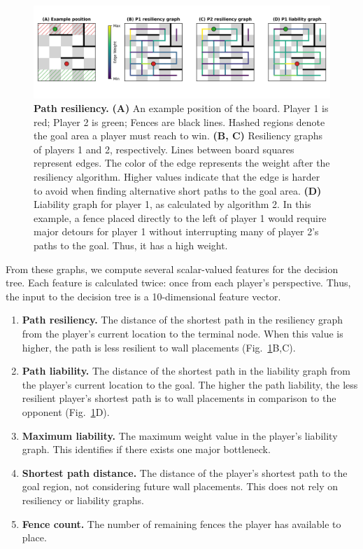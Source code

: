 \documentclass[10pt]{article}
\begin{document}
\begin{figure}[H]
    \centering
    \includegraphics[width=\linewidth]{path_figure.png}
    \caption{\textbf{Path resiliency.} \textbf{(A)} An example position of the board. Player 1 is red; Player 2 is green; Fences are black lines. Hashed regions denote the goal area a player must reach to win. \textbf{(B, C)} Resiliency graphs of players 1 and 2, respectively. Lines between board squares represent edges. The color of the edge represents the weight after the resiliency algorithm. Higher values indicate that the edge is harder to avoid when finding alternative short paths to the goal area. \textbf{(D)} Liability graph for player 1, as calculated by algorithm 2. In this example, a fence placed directly to the left of player 1 would require major detours for player 1 without interrupting many of player 2's paths to the goal. Thus, it has a high weight.}
    \label{fig:resiliency}
\end{figure}


From these graphs, we compute several scalar-valued features for the decision tree. Each feature is calculated twice: once from each player's perspective. Thus, the input to the decision tree is a 10-dimensional feature vector. 

\begin{enumerate}
    \item \textbf{Path resiliency.} The distance of the shortest path in the resiliency graph from the player's current location to the terminal node. When this value is higher, the path is less resilient to wall placements (Fig.~\ref{fig:resiliency}B,C).
    \item \textbf{Path liability.} The distance of the shortest path in the liability graph from the player's current location to the goal. The higher the path liability, the less resilient player's shortest path is to wall placements in comparison to the opponent (Fig.~\ref{fig:resiliency}D).
    \item \textbf{Maximum liability.} The maximum weight value in the player's liability graph. This identifies if there exists one major bottleneck.
    \item \textbf{Shortest path distance.} The distance of the player's shortest path to the goal region, not considering future wall placements. This does not rely on resiliency or liability graphs.
    \item \textbf{Fence count.} The number of remaining fences the player has available to place.
\end{enumerate}
\end{document}
